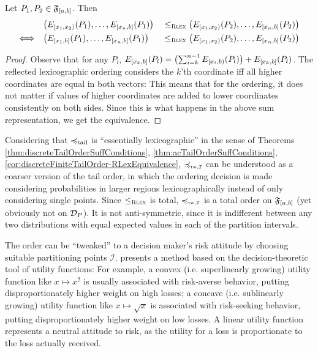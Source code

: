 \documentclass[a4paper]{scrreprt}
\begin{document}
    \begin{lemma}
        Let $P_1, P_2 \in \mathfrak{F}_{[a, b]}$.
        Then
        \begin{alignat*}{3}
                                     &\bigl(E_{[x_1, x_2)}(P_{1}), \dots, E_{[x_n, b]}(P_1)\bigr)\; &\leq_{\textsc{Rlex}} \bigl(E_{[x_1, x_2)}(P_2), \dots, E_{[x_n, b]}(P_2)\bigr) \\
            \Longleftrightarrow\quad &\bigl(E_{[x_1, b]}(P_{1}), \dots, E_{[x_n, b]}(P_1)\bigr) &\leq_{\textsc{Rlex}} \bigl(E_{[x_1, x_2)}(P_2), \dots, E_{[x_n, b]}(P_2)\bigr)
        \end{alignat*}
    \end{lemma}
    \begin{proof}
        Observe that for any $P_l$, $E_{[x_k, b]}(P_l) = \bigl(\sum_{i=k}^{n-1} E_{[x_i, b)}(P_l)\bigr) + E_{[x_k, b]}(P_l)$.
        The reflected lexicographic ordering considers the $k$'th coordinate iff all higher coordinates are equal in both vectors:
        This means that for the ordering, it does not matter if values of higher coordinates are added to lower coordinates consistently on both sides.
        Since this is what happens in the above sum representation, we get the equivalence.
    \end{proof}

    Considering that $\preccurlyeq_{\text{tail}}$ is “essentially lexicographic” in the sense of Theorems \ref{thm:discreteTailOrderSuffConditions}, \ref{thm:acTailOrderSuffConditions}, \ref{cor:discreteFiniteTailOrder-RLexEquivalence},
    $\leqtw$ can be understood as a coarser version of the tail order, in which the ordering decision is made considering probabilities in larger regions lexicographically instead of only considering single points.
    Since $\leq_{\textsc{Rlex}}$ is total, $\leqtw$ is a total order on $\mathfrak{F}_{[a, b]}$ (yet obviously not on $\mathcal{D}_P$). It is not anti-symmetric, since it is indifferent between any two distributions with equal expected values in each of the partition intervals.
    
    The order can be “tweaked” to a decision maker's risk attitude by choosing suitable partitioning points $\mathcal{I}$. \cite{bib:tweakableStochasticOrders} presents a method based on the decision-theoretic tool of utility functions: For example, a convex (i.e. superlinearly growing) utility function like $x \mapsto x^2$ is usually associated with risk-averse behavior, putting disproportionately higher weight on high losses; a concave (i.e. sublinearly growing) utility function like $x \mapsto \sqrt{x}$ is associated with risk-seeking behavior, putting disproportionately higher weight on low losses. A linear utility function represents a neutral attitude to risk, as the utility for a loss is proportionate to the loss actually received.
    
\end{document}
